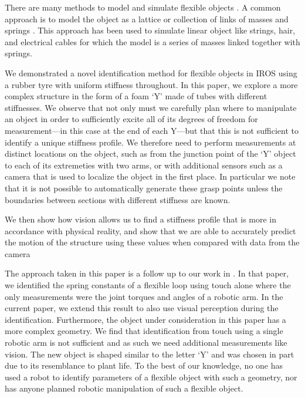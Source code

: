 \documentclass[runningheads,a4paper]{llncs}
\begin{document}
There are many methods to model and simulate flexible objects \cite{khalil_payeur,lang_etal}.  A common approach is to model the object as a lattice or collection of links of masses and springs \cite{sahari_etal,wakamatsu_etal,khalil_payeur}.  This approach has been used to simulate linear object like strings, hair, and electrical cables for which the model is a series of masses linked together with springs. %

We demonstrated a novel identification method for flexible objects in IROS using a rubber tyre with uniform stiffness throughout. In this paper, we explore a more complex structure in the form of a foam `Y' made of tubes with different stiffnesses. We observe that not only must we carefully plan where to manipulate an object in order to sufficiently excite all of its degrees of freedom for measurement---in this case at the end of each Y---but that this is not sufficient to identify a unique stiffness profile. We therefore need to perform measurements at distinct locations on the object, such as from the junction point of the `Y' object to each of its extremeties with two arms, or with additional sensors such as a camera that is used to localize the object in the first place. In particular we note that it is not possible to automatically generate these grasp points unless the boundaries between sections with different stiffness are known. 

We then show how vision allows us to find a stiffness profile that is more in accordance with physical reality, and show that we are able to accurately predict the motion of the structure using these values when compared with data from the camera

The approach taken in this paper is a follow up to our work in \cite{caldwell_coleman_correll_iros}. In that paper, we identified the spring constants of a flexible loop using touch alone where the only measurements were the joint torques and angles of a robotic arm. In the current paper, we extend this result to also use visual perception during the identification. Furthermore, the object under consideration in this paper has a more complex geometry.  We find that identification from touch using a single robotic arm is not sufficient and as such we need additional measurements like vision.  The new object is shaped similar to the letter `Y' and was chosen in part due to its resemblance to plant life.  To the best of our knowledge, no one has used a robot to identify parameters of a flexible object with such a geometry, nor has anyone planned robotic manipulation of such a flexible object.
\end{document}
